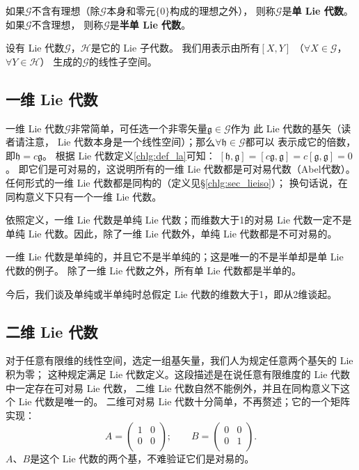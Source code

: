 \begin{definition}    
    如果$\mathscr{G}$不含有理想（除$\mathscr{G}$本身和零元$\{0\}$构成的理想之外），
    则称$\mathscr{G}$是\textbf{单 Lie 代数}。
    如果$\mathscr{G}$不含理想，
    则称$\mathscr{G}$是\textbf{半单 Lie 代数}。
\end{definition}


设有 Lie 代数$\mathscr{G}$，$\mathscr{H}$是它的 Lie 子代数。
我们用表示由所有$[X,Y]$
（$\forall X\in \mathscr{G}$，$\forall Y\in\mathscr{H}$）
生成的$\mathscr{G}$的线性子空间。

\subsection{一维 Lie 代数}
一维 Lie 代数$\mathscr{G}$非常简单，可任选一个非零矢量$\mathfrak{g}\in \mathscr{G}$作为
此 Lie 代数的基矢（读者请注意， Lie 代数本身是一个线性空间）；那么$\forall \mathfrak{h}\in \mathscr{G}$都可以
表示成它的倍数，即$\mathfrak{h} = c \mathfrak{g}$。
根据 Lie 代数定义\ref{chlg:def_la}可知：
$[\mathfrak{h},\mathfrak{g}]= [c\mathfrak{g},\mathfrak{g}] = c[\mathfrak{g},\mathfrak{g}] =0 $。
即它们是可对易的，这说明所有的一维 Lie 代数都是可对易代数（Abel代数）。
任何形式的一维 Lie 代数都是同构的（定义见\S\ref{chlg:sec_lieiso}）；
换句话说，在同构意义下只有一个一维 Lie 代数。

依照定义，一维 Lie 代数是单纯 Lie 代数；而维数大于1的对易 Lie 代数一定不是
单纯 Lie 代数。因此，除了一维 Lie 代数外，单纯 Lie 代数都是不可对易的。

一维 Lie 代数是单纯的，并且它不是半单纯的；这是唯一的不是半单却是单 Lie 代数的例子。
除了一维 Lie 代数之外，所有单 Lie 代数都是半单的。

今后，我们谈及{\kaishu 单纯}或{\kaishu 半单纯}时总假定 Lie 代数的维数大于1，即从2维谈起。


\subsection{二维 Lie 代数}\label{chlg:sec_2DLA}

对于任意有限维的线性空间，选定一组基矢量，我们人为规定任意两个基矢的 Lie 积为零；
这种规定满足 Lie 代数定义。这段描述是在说任意有限维度的 Lie 代数中一定存在可对易 Lie 代数，
二维 Lie 代数自然不能例外，并且在同构意义下这个 Lie 代数是唯一的。
二维可对易 Lie 代数十分简单，不再赘述；它的一个矩阵实现：
\begin{equation}
A=\left(
\begin{array}{cc}
    1 & 0 \\
    0 & 0 \\
\end{array}\right);\qquad
B=\left(
\begin{array}{cc}
    0 & 0 \\
    0 & 1 \\
\end{array}
\right).
\end{equation}
$A$、$B$是这个 Lie 代数的两个基，不难验证它们是对易的。


